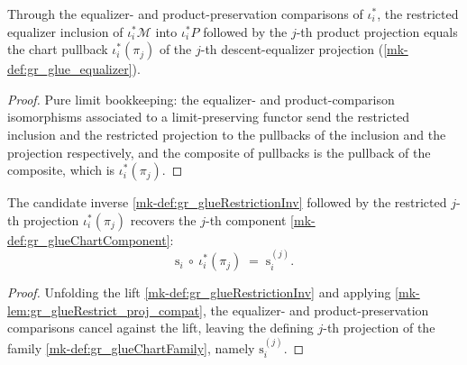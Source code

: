 \begin{lemma}\label{mk-lem:gr_glueRestrict_proj_compat}
  \leanok

  Through the equalizer- and product-preservation comparisons of \(\iota_i^{*}\), the
  restricted equalizer inclusion of \(\iota_i^{*}\mathcal{M}\) into \(\iota_i^{*}P\)
  followed by the \(j\)-th product projection equals the chart pullback
  \(\iota_i^{*}(\pi_j)\) of the \(j\)-th descent-equalizer projection
  (\ref{mk-def:gr_glue_equalizer}).
\end{lemma}
\begin{proof}
  \leanok
  Pure limit bookkeeping: the equalizer- and product-comparison isomorphisms
  associated to a limit-preserving functor send the restricted inclusion and the
  restricted projection to the pullbacks of the inclusion and the projection
  respectively, and the composite of pullbacks is the pullback of the composite, which
  is \(\iota_i^{*}(\pi_j)\).
\end{proof}

\begin{lemma}\label{mk-lem:gr_glueRestrictionInv_proj}
  \leanok

  The candidate inverse \ref{mk-def:gr_glueRestrictionInv} followed by the restricted
  \(j\)-th projection \(\iota_i^{*}(\pi_j)\) recovers the \(j\)-th component
  \ref{mk-def:gr_glueChartComponent}:
  \[
    \mathrm{s}_i\ \circ\ \iota_i^{*}(\pi_j)
      \;=\; \mathrm{s}_i^{(j)} .
  \]
\end{lemma}
\begin{proof}
  \leanok
  Unfolding the lift \ref{mk-def:gr_glueRestrictionInv} and applying
  \ref{mk-lem:gr_glueRestrict_proj_compat}, the equalizer- and product-preservation
  comparisons cancel against the lift, leaving the defining \(j\)-th projection of the
  family \ref{mk-def:gr_glueChartFamily}, namely \(\mathrm{s}_i^{(j)}\).
\end{proof}

